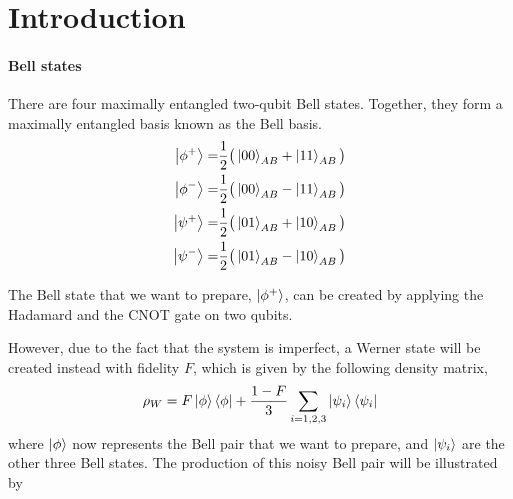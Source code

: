 \chapter{Introduction}

\subsubsection*{Bell states}

There are four maximally entangled two-qubit Bell states. Together, they form a maximally entangled basis known as the Bell basis.
\begin{align}\label{bellpairs}
  \ket{\phi^+} =& \frac{1}{2}\big(\ket{00}_{AB} + \ket{11}_{AB}\big) \\
  \ket{\phi^-} =& \frac{1}{2}\big(\ket{00}_{AB} - \ket{11}_{AB}\big) \\
  \ket{\psi^+} =& \frac{1}{2}\big(\ket{01}_{AB} + \ket{10}_{AB}\big) \\
  \ket{\psi^-} =& \frac{1}{2}\big(\ket{01}_{AB} - \ket{10}_{AB}\big)
\end{align}

The Bell state that we want to prepare, $\ket{\phi^+}$, can be created by applying the Hadamard and the CNOT gate on two qubits.

\begin{center}
\end{center}

However, due to the fact that the system is imperfect, a Werner state will be created instead with fidelity $F$, which is given by the following density matrix,
\begin{equation}\label{werner}
  \rho_W = F\ket{\phi}\bra{\phi} + \frac{1-F}{3}\sum_{i=1,2,3}\ket{\psi_i}\bra{\psi_i}
\end{equation}
where $\ket{\phi}$ now represents the Bell pair that we want to prepare, and $\ket{\psi_i}$ are the other three Bell states. The production of this noisy Bell pair will be illustrated by
\begin{center}
\end{center}

